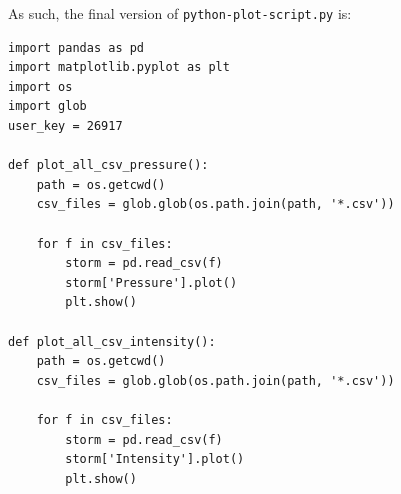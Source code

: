 \documentclass[]{article}
\begin{document}
As such, the final version of \lstinline{python-plot-script.py} is:

\begin{lstlisting}[caption=The final version of python-plot-script.py after all conflicts were resolved.]
import pandas as pd
import matplotlib.pyplot as plt
import os
import glob
user_key = 26917

def plot_all_csv_pressure():
    path = os.getcwd()
    csv_files = glob.glob(os.path.join(path, '*.csv')) 

    for f in csv_files:
        storm = pd.read_csv(f)
        storm['Pressure'].plot()
        plt.show()
		
def plot_all_csv_intensity():
    path = os.getcwd()
    csv_files = glob.glob(os.path.join(path, '*.csv'))
    
    for f in csv_files:
        storm = pd.read_csv(f)
        storm['Intensity'].plot()
        plt.show()
\end{lstlisting}
\end{document}
